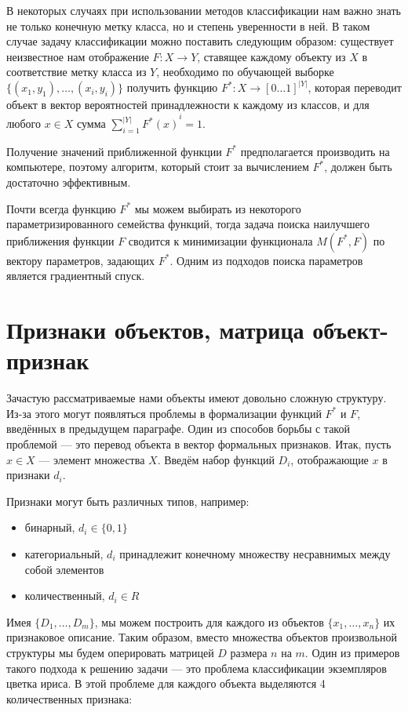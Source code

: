 В некоторых случаях при использовании методов классификации нам важно знать не только конечную метку класса, но и степень уверенности в ней. В таком случае задачу классификации можно поставить следующим образом: существует неизвестное нам отображение $F : X \to Y$, ставящее каждому объекту из $X$ в соответствие метку класса из $Y$, необходимо по обучающей выборке $\{ (x_1, y_1), \dots, (x_i, y_i) \}$ получить функцию $F^* : X \to [0 \dots 1]^{|Y|}$, которая переводит объект в вектор вероятностей принадлежности к каждому из классов, и для любого $x \in X$ сумма $\sum_{i=1}^{|Y|} {F^*(x)}^{i} = 1$.

Получение значений приближенной функции $F^*$ предполагается производить на компьютере, поэтому алгоритм, который стоит за вычислением $F^*$, должен быть достаточно эффективным. 

Почти всегда функцию $F^*$ мы можем выбирать из некоторого параметризированного семейства функций, тогда задача поиска наилучшего приближения функции $F$ сводится к минимизации функционала $M(F^*, F)$ по вектору параметров, задающих $F^*$. Одним из подходов поиска параметров является градиентный спуск.

\section{Признаки объектов, матрица объект-признак}

Зачастую рассматриваемые нами объекты имеют довольно сложную структуру. Из-за этого могут появляться проблемы в формализации функций $F^*$ и $F$, введённых в предыдущем параграфе. Один из способов борьбы с такой проблемой — это перевод объекта в вектор формальных признаков.
Итак, пусть $x \in X$ — элемент множества $X$. Введём набор функций $D_i$, отображающие $x$ в признаки $d_i$.

Признаки могут быть различных типов, например:
\begin{itemize}
\item бинарный, $d_i \in \{0, 1\}$
\item категориальный, $d_i$ принадлежит конечному множеству несравнимых между собой элементов
\item количественный, $d_i \in R$
\end{itemize}

Имея $\{D_1,…,D_m\}$, мы можем построить для каждого из объектов $\{x_1,…,x_n\}$ их признаковое описание. Таким образом, вместо множества объектов произвольной структуры мы будем оперировать матрицей $D$ размера $n$ на $m$. Один из примеров такого подхода к решению задачи — это проблема классификации экземпляров цветка ириса. В этой проблеме для каждого объекта выделяются 4 количественных признака:

